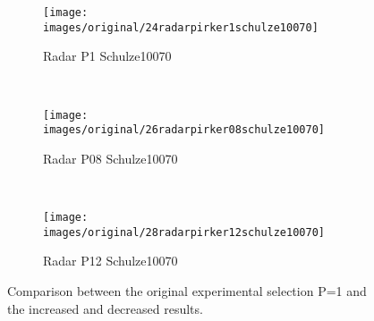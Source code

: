 \begin{figure}[htp] \centering
    \begin{subfigure}[b]{0.96\columnwidth}
        \texttt{[image: images/original/24radarpirker1schulze10070]}
        \caption{Radar P1 Schulze10070}
        \label{fig:24radarpirker1schulze10070}
    \end{subfigure} \\
        \begin{subfigure}[b]{0.96\columnwidth}
        \texttt{[image: images/original/26radarpirker08schulze10070]}
        \caption{Radar P08 Schulze10070}
        \label{fig:26radarpirker08schulze10070} 
    \end{subfigure}\\
        \begin{subfigure}[b]{0.96\columnwidth}
        \texttt{[image: images/original/28radarpirker12schulze10070]}
        \caption{Radar P12 Schulze10070}
        \label{fig:28radarpirker12schulze10070} 
    \end{subfigure}
    \caption{Comparison between the original experimental selection P=1 and the
    increased and decreased results.}
    \label{fig:29schulzeradarandcloud}
\end{figure}
